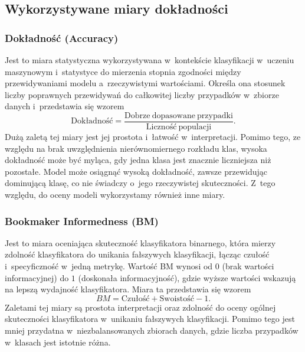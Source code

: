 \documentclass[12pt]{article}
\begin{document}
	\subsection{Wykorzystywane miary dokładności}\label{subsec:miary-dokladnosci}
	
	\subsubsection{Dokładność (Accuracy)}
	Jest to miara statystyczna wykorzystywana w~kontekście klasyfikacji w~uczeniu maszynowym i~statystyce do mierzenia stopnia zgodności między przewidywaniami modelu a~rzeczywistymi wartościami. Określa ona stosunek liczby poprawnych przewidywań do całkowitej liczby przypadków w~zbiorze danych i~przedstawia się wzorem 
	\[\mathrm{Dokładność} = \frac{\mathrm{Dobrze~dopasowane~przypadki}}{\mathrm{Liczność~populacji}}.\] 
	Dużą zaletą tej miary jest jej prostota i~łatwość w~interpretacji. Pomimo tego, ze względu na brak uwzględnienia nierównomiernego rozkładu klas, wysoka dokładność może być myląca, gdy jedna klasa jest znacznie liczniejsza niż pozostałe. Model może osiągnąć wysoką dokładność, zawsze przewidując dominującą klasę, co nie świadczy o~jego rzeczywistej skuteczności. Z~tego względu, do oceny modeli wykorzystamy również inne miary.
	
	\subsubsection{Bookmaker Informedness (BM)}
	Jest to miara oceniająca skuteczność klasyfikatora binarnego, która mierzy zdolność klasyfikatora do unikania fałszywych klasyfikacji, łącząc czułość i~specyficzność w~jedną metrykę. Wartość BM wynosi od $0$ (brak wartości informacyjnej) do $1$ (doskonała informacyjność), gdzie wyższe wartości wskazują na lepszą wydajność klasyfikatora. Miara ta przedstawia się wzorem
	\[BM = \mathrm{Czułość} + \mathrm{Swoistość} - 1.\] 
	Zaletami tej miary są prostota interpretacji oraz zdolność do oceny ogólnej skuteczności klasyfikatora w~unikaniu fałszywych klasyfikacji. Pomimo tego jest mniej przydatna w~niezbalansowanych zbiorach danych, gdzie liczba przypadków w~klasach jest istotnie różna.
	
\end{document}
